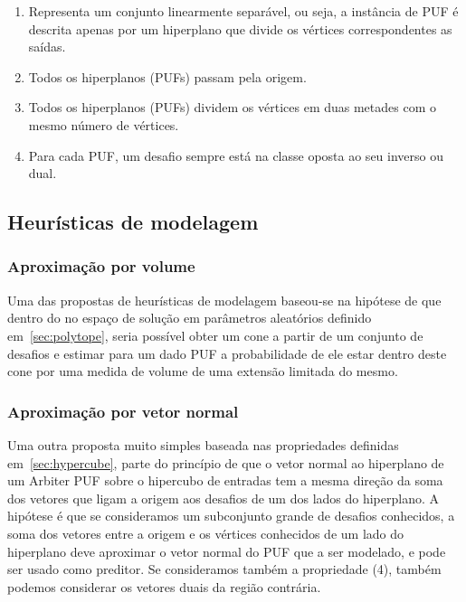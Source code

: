 \documentclass[pdftex,11pt]{article}
\begin{document}
\begin{spacing}{1.5}
\begin{spacing}{1.0}
\begin{enumerate}
\item Representa um conjunto linearmente separável, ou seja, a instância de PUF é descrita apenas por um hiperplano que divide os vértices correspondentes as saídas.
\item Todos os hiperplanos (PUFs) passam pela origem.
\item Todos os hiperplanos (PUFs) dividem os vértices em duas metades com o mesmo número de vértices.
\item Para cada PUF, um desafio sempre está na classe oposta ao seu inverso ou dual.
\end{enumerate}
\end{spacing}


\subsection{Heurísticas de modelagem}


\subsubsection{Aproximação por volume}

Uma das propostas de heurísticas de modelagem baseou-se na hipótese de que dentro do
no espaço de solução em parâmetros aleatórios definido em~\ref{sec:polytope},
seria possível obter um cone a partir de um conjunto de desafios e estimar para um dado PUF
a probabilidade de ele estar dentro deste cone por uma medida de volume de uma extensão
limitada do mesmo.

\subsubsection{Aproximação por vetor normal}

Uma outra proposta muito simples baseada nas propriedades definidas em~\ref{sec:hypercube},
parte do princípio de que o vetor normal ao hiperplano de um Arbiter PUF sobre o hipercubo
de entradas tem a mesma direção da soma dos vetores que ligam a origem aos desafios
de um dos lados do hiperplano. A hipótese é que se consideramos um subconjunto grande
de desafios conhecidos, a soma dos vetores entre a origem e os vértices conhecidos
de um lado do hiperplano deve aproximar o vetor normal do PUF que a ser modelado,
e pode ser usado como preditor.
Se consideramos também a propriedade (4), também podemos considerar os vetores duais
da região contrária.


\end{spacing}
\end{document}
